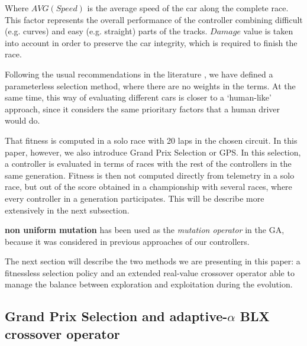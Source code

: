 \documentclass[10pt,journal,compsoc]{IEEEtran}
\begin{document}
Where $AVG(Speed)$ is the average speed of the car along the complete
race. This factor represents the overall performance of the controller
combining difficult (e.g. curves) and easy (e.g. straight) parts of
the tracks. $Damage$ value is taken into account in order to preserve
the car integrity, which is required to finish the race. 

Following the usual recommendations in the literature
\cite{Harik-ParameterLess99}, we have defined a parameterless
selection method, where there are no weights in the terms.
At the same time, this way of evaluating different cars is closer to a `human-like'
approach, since it considers the same prioritary factors that a human
driver would do.

That fitness is computed in a solo race with 20 laps in the chosen circuit. In this
paper, however, we also introduce Grand Prix Selection or GPS. In this
selection, a controller is evaluated in terms of races with the rest
of the controllers in the same generation. Fitness is then not
computed directly from telemetry in a solo race, but out of the score
obtained in a championship with several races, where every controller
in a generation participates. This will be describe more extensively
in the next subsection.

\textbf{non uniform mutation} \cite{mutation1997} has been used as the
\textit{mutation operator} in the GA, because it was considered in
previous approaches of our controllers. 

The next section will describe the two methods we are presenting in
this paper: a fitnessless selection policy and an extended real-value
crossover operator able to manage the balance between exploration and
exploitation during the evolution. 

\subsection{Grand Prix Selection and adaptive-$\alpha$ BLX crossover operator}
\label{subsec:novel_operators}


\end{document}
